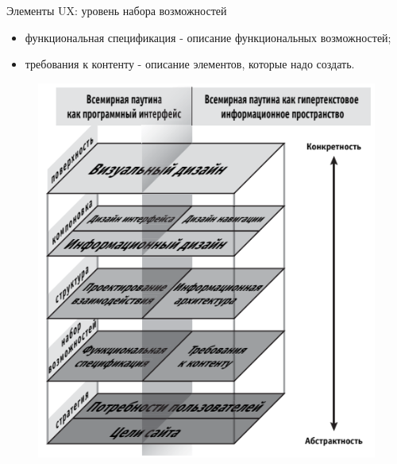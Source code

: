 \documentclass{beamer}
\begin{document}
\begin{frame}{Элементы UX: уровень набора возможностей}
\begin{itemize}
\item функциональная спецификация - описание функциональных возможностей;
\item требования к контенту - описание элементов, которые надо создать.
\end{itemize}
\begin{figure}[h]
\centering
\includegraphics[scale=0.4]{images/lec01-pic12.png}
\end{figure}
\end{frame}
\end{document}
